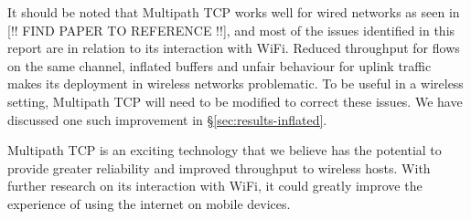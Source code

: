 It should be noted that Multipath TCP works well for wired 
networks as seen in [!! FIND PAPER TO REFERENCE !!], and most of the issues identified
in this report are in relation to its interaction with WiFi. Reduced throughput
for flows on the same channel, inflated buffers and unfair behaviour for uplink
traffic makes its deployment in wireless networks problematic. To be useful in a
wireless setting, Multipath TCP will need to be modified to correct these issues.
We have discussed one such improvement in
\S\ref{sec:results-inflated}.

Multipath TCP is an exciting technology that we believe has the potential to 
provide greater reliability and improved throughput to wireless hosts. With
further research on its interaction with WiFi, it could greatly improve the
experience of using the internet on mobile devices.

